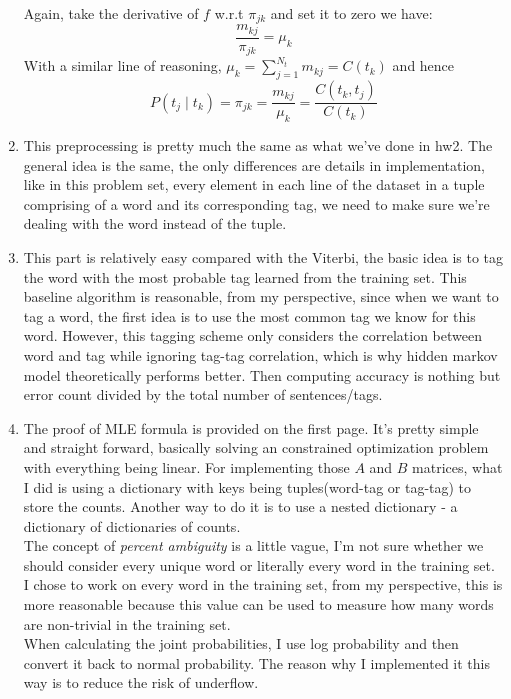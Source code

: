 \documentclass[12pt]{article}
\begin{document}
\begin{enumerate}
\begin{equation*}
  \end{equation*}
  Again, take the derivative of $f$ w.r.t $\pi_{jk}$ and set it to zero we have:
  \begin{equation*}
  \frac{m_{kj}}{\pi_{jk}} = \mu_{k}
  \end{equation*} 
  With a similar line of reasoning, $\mu_{k} = \sum_{j=1}^{N_{t}} m_{kj} = C(t_{k})$ and hence
  \begin{equation*}
  P(t_{j} \mid t_{k}) = \pi_{jk} = \frac{m_{kj}}{\mu_{k}} = \frac{C(t_{k}, t_{j})}{C(t_{k})}
  \end{equation*} 
	\item
	This preprocessing is pretty much the same as what we've done in hw2. The general idea is the same, the only differences are details in implementation, like in this problem set, every element in each line of the dataset in a tuple comprising of a word and its corresponding tag, we need to make sure we're dealing with the word instead of the tuple.
	\item
	This part is relatively easy compared with the Viterbi, the basic idea is to tag the word with the most probable tag learned from the training set. This baseline algorithm is reasonable, from my perspective, since when we want to tag a word, the first idea is to use the most common tag we know for this word. However, this tagging scheme only considers the correlation between word and tag while ignoring tag-tag correlation, which is why hidden markov model theoretically performs better.
	Then computing accuracy is nothing but error count divided by the total number of sentences/tags.
	\item
	The proof of MLE formula is provided on the first page. It's pretty simple and straight forward, basically solving an constrained optimization problem with everything being linear.
	For implementing those $A$ and $B$ matrices, what I did is using a dictionary with keys being tuples(word-tag or tag-tag) to store the counts. Another way to do it is to use a nested dictionary - a dictionary of dictionaries of counts. \\
	The concept of \textit{percent ambiguity} is a little vague, I'm not sure whether we should consider every unique word or literally every word in the training set. I chose to work on every word in the training set, from my perspective, this is more reasonable because this value can be used to measure how many words are non-trivial in the training set.\\
	When calculating the joint probabilities, I use log probability and then convert it back to normal probability. The reason why I implemented it this way is to reduce the risk of underflow. \\

\end{enumerate}
\end{document}
